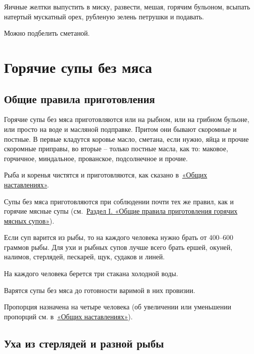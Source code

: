 Яичные желтки выпустить в миску, развести, мешая, горячим бульоном, всыпать натертый мускатный орех, рубленую зелень петрушки и подавать.

Можно подбелить сметаной.

\newpage
\section{Горячие супы без мяса}

\subsection*{Общие правила приготовления} \label{2sec:obschie-bez-miasa}

Горячие супы без мяса приготовляются или на рыбном, или на грибном бульоне, или просто на воде и масляной подправке. Притом они бывают скоромные и постные. В первые кладутся коровье масло, сметана, если нужно, яйца и прочие скоромные приправы, во вторые – только постные масла, как то: маковое, горчичное, миндальное, прованское, подсолнечное и прочие.

Рыба и коренья чистятся и приготовляются, как сказано в~\hyperref[0sec:obsch-nast]{«Общих наставлениях»}.

Супы без мяса приготовляются при соблюдении почти тех же правил, как и горячие мясные супы (см.~\hyperref[1sec:obschie-sup]{Раздел I. «Общие правила приготовления горячих мясных супов»}).

Если суп варится из рыбы, то на каждого человека нужно брать от 400–600 граммов рыбы. Для ухи и рыбных супов лучше всего брать ершей, окуней, налимов, стерлядей, пескарей, щук, судаков и линей.

На каждого человека берется три стакана холодной воды.

Варятся супы без мяса до готовности варимой в них провизии.

Пропорция назначена на четыре человека (об увеличении или уменьшении пропорций см. в~\hyperref[0sec:obsch-nast]{«Общих наставлениях»}).

\subsection{Уха из стерлядей и разной рыбы}\label{1uha-sterl}

